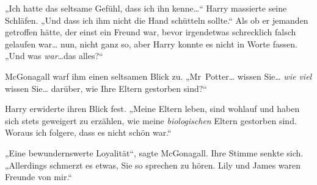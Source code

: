 „Ich hatte das seltsame Gefühl, dass ich ihn kenne…“ Harry massierte seine Schläfen. „Und dass ich ihm nicht die Hand schütteln sollte.“ Als ob er jemanden getroffen hätte, der einst ein Freund war, bevor irgendetwas schrecklich falsch gelaufen war… nun, nicht ganz so, aber Harry konnte es nicht in Worte fassen. „Und was \emph{war}…das alles?“

McGonagall warf ihm einen seltsamen Blick zu. „Mr~Potter… wissen Sie… \emph{wie viel} wissen Sie… darüber, wie Ihre Eltern gestorben sind?“

Harry erwiderte ihren Blick fest. „Meine Eltern leben, sind wohlauf und haben sich stets geweigert zu erzählen, wie meine \emph{biologischen} Eltern gestorben sind. Woraus ich folgere, dass es nicht schön war.“

„Eine bewundernswerte Loyalität“, sagte McGonagall. Ihre Stimme senkte sich. „Allerdings schmerzt es etwas, Sie so sprechen zu hören. Lily und James waren Freunde von mir.“


